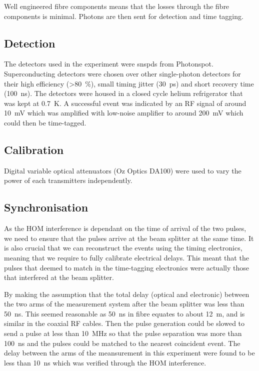 Well engineered fibre components means that the losses through the fibre components is minimal. Photons are then sent for detection and time tagging.

\subsection{Detection}

The detectors used in the experiment were \acp{snspd} from Photonspot. Superconducting detectors were chosen over other single-photon detectors for their high efficiency (\SI{>80}{\percent}), small timing jitter (\SI{30}{\ps}) and short recovery time (\SI{100}{\ns}). The detectors were housed in a closed cycle helium refrigerator that was kept at \SI{0.7}{K}. A successful event was indicated by an RF signal of around \SI{10}{\mV} which was amplified with low-noise amplifier to around \SI{200}{\mV} which could then be time-tagged.

\subsection{Calibration}

Digital variable optical attenuators (Oz Optics DA100) were used to vary the power of each transmitters independently. 

\subsection{Synchronisation}

As the \ac{HOM} interference is dependant on the time of arrival of the two pulses, we need to ensure that the pulses arrive at the beam splitter at the same time. It is also crucial that we can reconstruct the events using the timing electronics, meaning that we require to fully calibrate electrical delays. This meant that the pulses that deemed to match in the time-tagging electronics were actually those that interfered at the beam splitter. 

By making the assumption that the total delay (optical and electronic) between the two arms of the measurement system after the beam splitter was less than \SI{50}{\ns}. This seemed reasonable as \SI{50}{\ns} in fibre equates to about \SI{12}{\m}, and is similar in the coaxial RF cables. Then the pulse generation could be slowed to send a pulse at less than \SI{10}{\MHz} so that the pulse separation was more than \SI{100}{\ns} and the pulses could be matched to the nearest coincident event. The delay between the arms of the meansurement in this experiment were found to be less than \SI{10}{\ns} which was verified through the \ac{HOM} interference.

